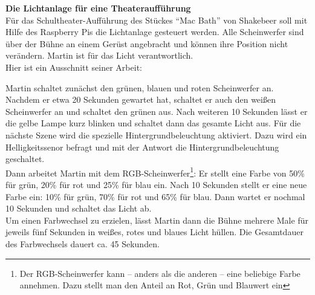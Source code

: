 \documentclass[11pt, a4paper]{article}
\begin{document}
\pagestyle{empty}
\textbf{{\Large Die Lichtanlage für eine Theateraufführung}}\\

Für das Schultheater-Aufführung des Stückes \enquote{Mac Bath} von Shakebeer soll mit Hilfe des Raspberry Pis die Lichtanlage gesteuert werden. Alle Scheinwerfer sind über der Bühne an einem Gerüst angebracht und können ihre Position nicht verändern. Martin ist für das Licht verantwortlich. \\

Hier ist ein Ausschnitt seiner Arbeit:
\begin{mdframed}
Martin schaltet zunächst den grünen, blauen und roten Scheinwerfer an. Nachdem er etwa 20 Sekunden gewartet hat, schaltet er auch den weißen Scheinwerfer an und schaltet den grünen aus. Nach weiteren  10 Sekunden lässt er die gelbe Lampe kurz blinken und schaltet dann das gesamte Licht aus. Für die nächste Szene wird die spezielle Hintergrundbeleuchtung aktiviert. Dazu wird ein Helligkeitssenor befragt und mit der Antwort die Hintergrundbeleuchtung geschaltet.\\

Dann arbeitet Martin mit dem RGB-Scheinwerfer\footnote{Der RGB-Scheinwerfer kann -- anders als die anderen -- eine beliebige Farbe annehmen. Dazu stellt man den Anteil an Rot, Grün und Blauwert ein}: Er stellt eine Farbe von 50\% für grün, 20\% für rot und 25\% für blau ein. Nach 10 Sekunden stellt er eine neue Farbe ein: 10\% für grün, 70\% für rot und 65\% für blau. Dann wartet er nochmal 10 Sekunden und schaltet das Licht ab.\\

Um einen Farbwechsel zu erzielen, lässt Martin dann die Bühne mehrere Male für jeweils fünf Sekunden in weißes, rotes und blaues Licht hüllen. Die Gesamtdauer des Farbwechsels dauert ca. 45 Sekunden.\\
\end{mdframed}
\end{document}
